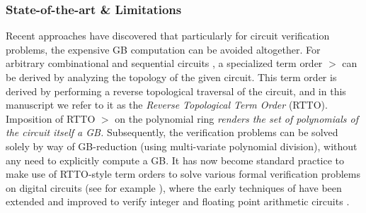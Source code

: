 \subsubsection{State-of-the-art \& Limitations} Recent
approaches \cite{wienand:cav08} \cite{lv:tcad2013} have discovered that
particularly for circuit verification problems, the
expensive GB computation can be avoided altogether. For arbitrary
combinational \cite{wienand:cav08} \cite{lv:tcad2013} and sequential
circuits \cite{xiaojun:hldvt2016}, a specialized term order 
$>$ can be derived by analyzing the topology of the given 
circuit. This term order is derived by performing a reverse
topological traversal of the circuit, and in this manuscript we refer 
to it as the {\it Reverse Topological Term Order} (RTTO). 
Imposition of RTTO $>$ on the polynomial ring
{\it renders the set of polynomials of the circuit itself a
GB.} Subsequently, the verification problems can be solved solely by
way of GB-reduction (using multi-variate polynomial division), without
any need to explicitly compute a GB. It has now become standard
practice to make use of RTTO-style term orders to solve various formal 
verification problems on digital circuits 
(see for example
\cite{wienand:cav08,lv:tcad2013,wedler:date11,ciesielski:dac2015,farimah:micro2015,rolf:date16}), 
where the early techniques of \cite{wienand:cav08} \cite{lv:tcad2013}
have been extended and improved to verify integer and floating point
arithmetic circuits \cite{ciesielski:dac2015,rolf:date16,rolf:fmcad17,Armin2017ColumnWiseVO}. 



